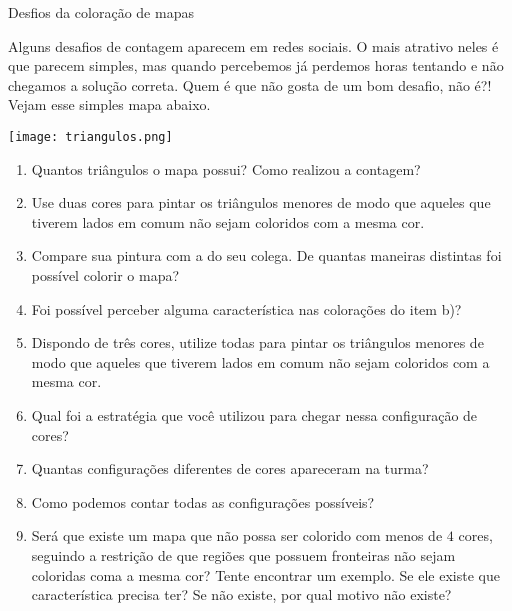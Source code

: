 \begin{task}{Desfios da coloração de mapas}
\label{coloracao-mapas}

Alguns desafios de contagem aparecem em redes sociais. O mais atrativo neles é que parecem simples, mas quando percebemos já perdemos horas tentando e não chegamos a solução correta. Quem é que não gosta de um bom desafio, não é?! 
Vejam esse simples mapa abaixo. 

\begin{center}
\texttt{[image: triangulos.png]}
\end{center}

\begin{enumerate}
\item Quantos triângulos o mapa possui? Como realizou a contagem?
\item Use duas cores para pintar os triângulos menores de modo que aqueles que tiverem lados em comum não sejam coloridos com a mesma cor. 
\item Compare sua pintura com a do seu colega.  De quantas maneiras distintas foi possível colorir o mapa? 
\item Foi possível perceber alguma característica nas colorações do item b)?
\item Dispondo de três cores, utilize todas para pintar os triângulos menores de modo que aqueles que tiverem lados em comum não sejam coloridos com a mesma cor.
\item Qual foi a estratégia que você utilizou para chegar nessa configuração de cores?
\item Quantas configurações diferentes de cores apareceram na turma?
\item Como podemos contar todas as configurações possíveis?
\item Será que existe um mapa que não possa ser colorido com menos de $4$ cores, seguindo a restrição de que regiões que possuem fronteiras não sejam coloridas coma a mesma cor? Tente encontrar um exemplo. Se ele existe que característica precisa ter? Se não existe, por qual motivo não existe?
\end{enumerate}

\end{task}

